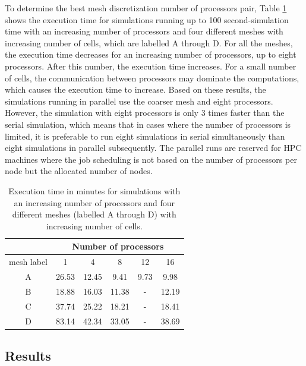 To determine the best mesh discretization number of processors pair, Table \ref{tab:serial-parallel} shows the execution time for simulations running up to 100 second-simulation time with an increasing number of processors and four different meshes with increasing number of cells, which are labelled A through D.
For all the meshes, the execution time decreases for an increasing number of processors, up to eight processors.
After this number, the execution time increases.
For a small number of cells, the communication between processors may dominate the computations, which causes the execution time to increase.
Based on these results, the simulations running in parallel use the coarser mesh and eight processors.
However, the simulation with eight processors is only 3 times faster than the serial simulation, which means that in cases where the number of processors is limited, it is preferable to run eight simulations in serial simultaneously than eight simulations in parallel subsequently.
The parallel runs are reserved for \gls*{HPC} machines where the job scheduling is not based on the number of processors per node but the allocated number of nodes.

\begin{table}[htbp!]
  \centering
  \caption{Execution time in minutes for simulations with an increasing number of processors and four different meshes (labelled A through D) with increasing number of cells.}
  \label{tab:serial-parallel}
\begin{tabular}{c|ccccc}
 \toprule
    & \multicolumn{5}{c}{Number of processors}       \\
 \midrule
  mesh label  & 1      & 4      & 8      & 12    & 16     \\
 \midrule
  A & 26.53  & 12.45  &  9.41  &  9.73 &  9.98  \\
  B & 18.88  & 16.03  & 11.38  &  -    & 12.19  \\
  C & 37.74  & 25.22  & 18.21  &  -    & 18.41  \\
  D & 83.14  & 42.34  & 33.05  &  -    & 38.69  \\
 \bottomrule
\end{tabular}
\end{table}


\subsection{Results}


